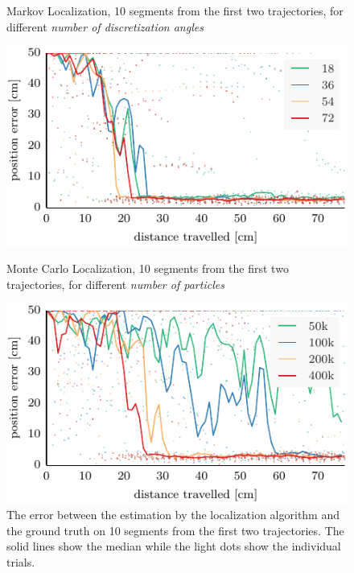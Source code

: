 \documentclass[letterpaper, 10pt, conference]{ieeeconf}
\begin{document}
\begin{figure}

\begin{center}
Markov Localization, 10 segments from the first two trajectories, for different \emph{number of discretization angles}
\end{center}
\includegraphics{ml-small_runs_random_12-xy}

\vspace{.3em}

\begin{center}
Monte Carlo Localization, 10 segments from the first two trajectories, for different \emph{number of particles}
\end{center}
\includegraphics{mcl-small_runs_random_12-xy}

\caption{
The error between the estimation by the localization algorithm and the ground truth on 10 segments from the first two trajectories.
The solid lines show the median while the light dots show the individual trials.}
\label{fig:small-runs}
\end{figure}
\end{document}
